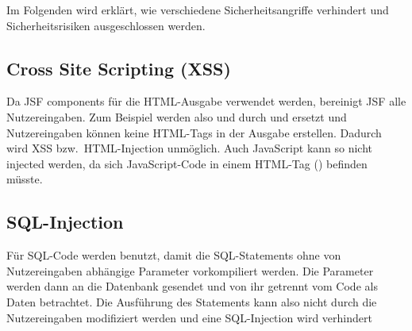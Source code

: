 
Im Folgenden wird erklärt, wie verschiedene Sicherheitsangriffe verhindert und Sicherheitsrisiken ausgeschlossen werden.

\subsection{Cross Site Scripting (XSS)}
Da JSF components für die HTML-Ausgabe verwendet werden, bereinigt JSF alle Nutzereingaben.
Zum Beispiel werden also  und  durch  und  ersetzt und Nutzereingaben können keine HTML-Tags in der Ausgabe erstellen.
Dadurch wird XSS bzw.\ HTML-Injection unmöglich.
Auch JavaScript kann so nicht injected werden, da sich JavaScript-Code in einem HTML-Tag () befinden müsste.

\subsection{SQL-Injection}
Für SQL-Code werden  benutzt, damit die SQL-Statements ohne von Nutzereingaben abhängige Parameter vorkompiliert werden.
Die Parameter werden dann an die Datenbank gesendet und von ihr getrennt vom Code als Daten betrachtet.
Die Ausführung des Statements kann also nicht durch die Nutzereingaben modifiziert werden und eine SQL-Injection wird verhindert


